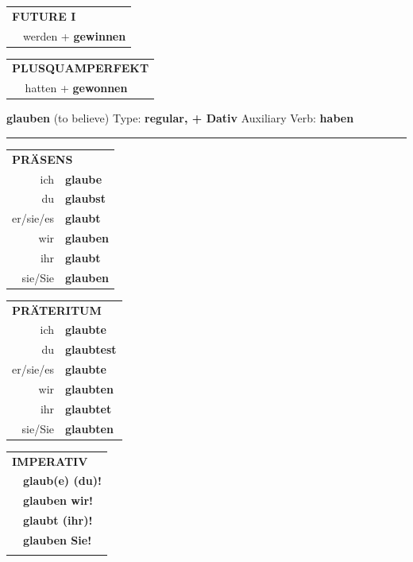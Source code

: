 \documentclass[10pt,a4paper]{revtex4-2}
\begin{document}
\begin{verbbox-acc}
\begin{tabular}{rl}
    \multicolumn{2}{l}{\textbf{FUTURE I} }\\
  &  werden + \textbf{gewinnen}\\
 
  \end{tabular}
\hfill
   \begin{tabular}{rl}
      \multicolumn{2}{l}{\textbf{PLUSQUAMPERFEKT}}\\
  &  hatten + \textbf{gewonnen}\\
  \end{tabular}
  
  \vspace{-5pt}


\end{verbbox-acc}
\begin{verbbox-dat}
    {\Large \bf glauben} (to believe) \hfill Type: \textbf{regular, + Dativ} \hfill Auxiliary Verb: \textbf{haben} 
    
     \vspace{5pt}

    \hrule
    
    \vspace{5pt}

  \begin{tabular}{rl}
     \multicolumn{2}{l}{\textbf{PRÄSENS} }\\
    ich & \textbf{glaube}\\
    du & \textbf{glaubst}\\
    er/sie/es & \textbf{glaubt}\\
    wir & \textbf{glauben}\\
    ihr & \textbf{glaubt}\\
    sie/Sie & \textbf{glauben}\\
  \end{tabular}
  \hfill
     \begin{tabular}{rl}
    \multicolumn{2}{l}{\textbf{PRÄTERITUM} }\\
    ich & \textbf{glaubte}\\
    du & \textbf{glaubtest}\\
    er/sie/es & \textbf{glaubte}\\
    wir & \textbf{glaubten}\\
    ihr & \textbf{glaubtet}\\
    sie/Sie & \textbf{glaubten}\\
  \end{tabular}
  \hfill
  \begin{tabular}{rl}
     \multicolumn{2}{l}{\textbf{IMPERATIV} }\\
   & \textbf{glaub(e) (du)!}\\
   & \textbf{glauben wir!}\\
   & \textbf{glaubt (ihr)!}\\
   & \textbf{glauben Sie!}\\
   & \vspace{10pt}
  \end{tabular}


\end{verbbox-dat}
\end{document}
